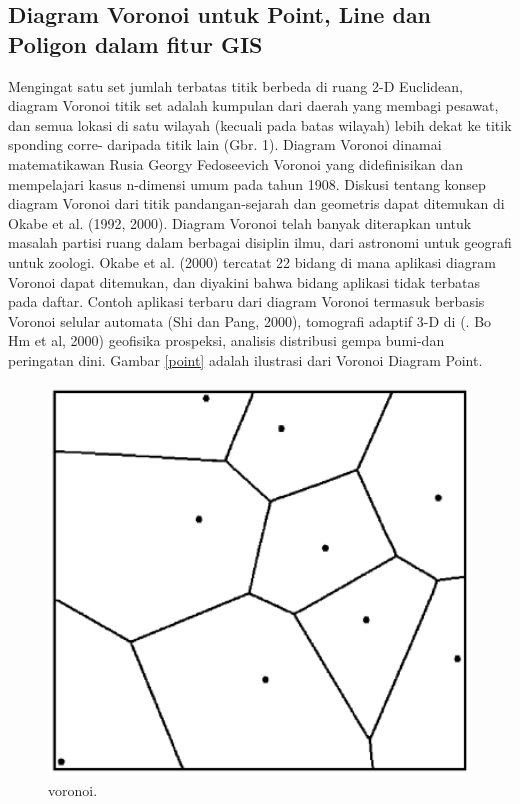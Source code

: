 \subsection{Diagram Voronoi untuk Point, Line dan Poligon dalam fitur GIS}
	Mengingat satu set jumlah terbatas titik berbeda di ruang 2-D Euclidean, diagram Voronoi titik set adalah kumpulan dari daerah yang membagi pesawat, dan semua lokasi di satu wilayah (kecuali pada batas wilayah) lebih dekat ke titik sponding corre- daripada titik lain (Gbr. 1). Diagram Voronoi dinamai matematikawan Rusia Georgy Fedoseevich Voronoi yang didefinisikan dan mempelajari kasus n-dimensi umum pada tahun 1908. Diskusi tentang konsep diagram Voronoi dari titik pandangan-sejarah dan geometris dapat ditemukan di Okabe et al. (1992, 2000).
	Diagram Voronoi telah banyak diterapkan untuk masalah partisi ruang dalam berbagai disiplin ilmu, dari astronomi untuk geografi untuk zoologi. Okabe et al. (2000) tercatat 22 bidang di mana aplikasi diagram Voronoi dapat ditemukan, dan diyakini bahwa bidang aplikasi tidak terbatas pada daftar. Contoh aplikasi terbaru dari diagram Voronoi termasuk berbasis Voronoi selular automata (Shi dan Pang, 2000), tomografi adaptif 3-D di (. Bo Hm et al, 2000) geofisika prospeksi, analisis distribusi gempa bumi-dan peringatan dini. Gambar \ref{point} adalah ilustrasi dari Voronoi Diagram Point.
\begin{figure}[ht]
	\centerline{\includegraphics[width=1\textwidth]{figures/voronoi.PNG}}
	\caption{voronoi.}
	\label{voronoi}
	\end{figure}

